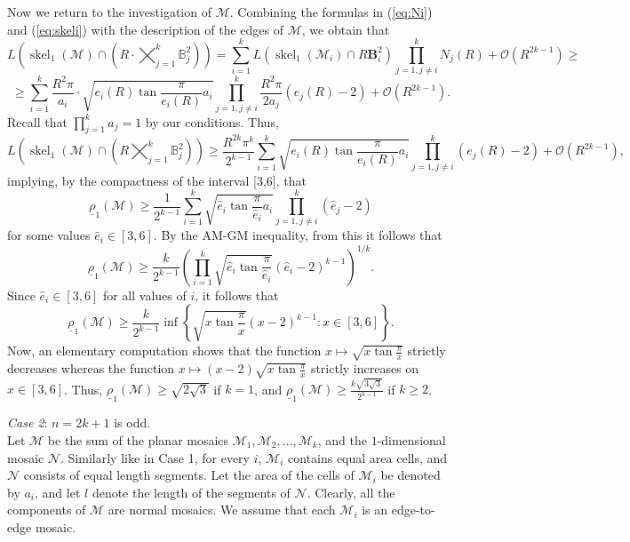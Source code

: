 \documentclass[twoside]{amsart}
\theoremstyle{definition}
\newcommand{\BB}{\mathbf B}
\newcommand{\M}{\mathcal{M}}
\DeclareMathOperator{\skel}{skel}
\begin{document}
Now we return to the investigation of $\M$. Combining the formulas in (\ref{eq:Ni}) and (\ref{eq:skeli}) with the description of the edges of $\M$, we obtain that   
\[
L\left(\skel_1(\M) \cap \left( R \cdot \bigtimes_{j=1}^k \mathbb{B}_j^2 \right) \right) = \sum_{i=1}^k L(\skel_1(\M_i) \cap R \BB^2_i) \prod_{j=1, j \neq i}^k N_j(R) + \mathcal{O}(R^{2k-1})\geq
\]
\[
\geq \sum_{i=1}^k \frac{R^2 \pi}{a_i} \cdot \sqrt{ e_i(R) \tan \frac{\pi}{e_i(R)} a_i} \prod_{j=1, j \neq i}^k  \frac{R^2 \pi}{2 a_j} \left( e_j(R) - 2 \right) + \mathcal{O}(R^{2k-1}).
\]
Recall that $\prod_{j=1}^k a_j = 1$ by our conditions. Thus,
\[
L\left(\skel_1(\M) \cap \left( R \bigtimes_{j=1}^k \mathbb{B}_j^2 \right) \right) \geq \frac{R^{2k} \pi^k}{2^{k-1}} \sum_{i=1}^k \sqrt{ e_i(R) \tan \frac{\pi}{e_i(R)} a_i} \prod_{j=1, j \neq i}^k \left( e_j(R) - 2 \right) + \mathcal{O}(R^{2k-1}),
\]
implying, by the compactness of the interval [3,6], that
\begin{equation}\label{eq:evenfinalestimate}
\underline{\rho}_1(\M) \geq \frac{1}{2^{k-1}} \sum_{i=1}^k \sqrt{ \hat{e}_i \tan \frac{\pi}{\hat{e}_i} a_i} \prod_{j=1, j \neq i}^k \left( \hat{e}_j - 2 \right)
\end{equation}
for some values $\hat{e}_i \in [3,6]$.
By the AM-GM inequality, from this it follows that
\[
\underline{\rho}_1(\M) \geq \frac{k}{2^{k-1}} \left( \prod_{i=1}^k \sqrt{\hat{e}_i  \tan \frac{\pi}{\hat{e}_i}} \left(\hat{e}_i - 2 \right)^{k-1}   \right)^{1/k}.
\]
Since $\hat{e}_i \in [3,6]$ for all values of $i$, it follows that
\[
\underline{\rho}_1(\M) \geq \frac{k}{2^{k-1}} \inf \left\{ \sqrt{x  \tan \frac{\pi}{x}} \left( x - 2 \right)^{k-1} : x \in [3,6] \right\}.
\]
Now, an elementary computation shows that the function $x \mapsto \sqrt{x  \tan \frac{\pi}{x}}$ strictly decreases whereas the function $x \mapsto (x-2) \sqrt{x  \tan \frac{\pi}{x}}$ strictly increases on $x \in [3,6]$. Thus, $\underline{\rho}_1(\M) \geq \sqrt{2 \sqrt{3}}$ if $k=1$, and $\underline{\rho}_1(\M) \geq \frac{k\sqrt{3 \sqrt{3}}}{2^{k-1}}$ if $k \geq 2$.

\emph{Case 2}: $n=2k+1$ is odd.\\

Let $\M$ be the sum of the planar mosaics $\M_1, \M_2, \ldots, \M_k$, and the $1$-dimensional mosaic $\mathcal{N}$. Similarly like in Case 1, for every $i$, $\M_i$ contains equal area cells, and $\mathcal{N}$ consists of equal length segments. Let the area of the cells of $\M_i$ be denoted by $a_i$, and let $l$ denote the length of the segments of $\mathcal{N}$. Clearly, all the components of $\M$ are normal mosaics. We assume that each $\M_i$ is an edge-to-edge mosaic.
\end{document}
